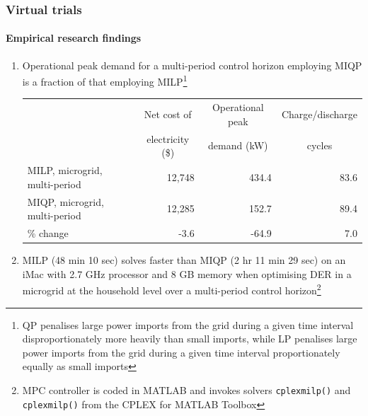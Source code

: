 \documentclass[handout, smaller, xcolor=table]{beamer}			%
\newcounter{enumcount}
\begin{document}
\begin{frame}
	\frametitle{Virtual trials}
	\framesubtitle{Empirical research findings}

	\begin{enumerate}
		\setcounter{enumi}{\value{enumcount}}
		\item  Operational peak demand for a multi-period control horizon employing MIQP is a fraction of that employing MILP\footnote{\scriptsize QP penalises large power imports from the grid during a given time interval disproportionately more heavily than small imports, while LP penalises large power imports from the grid during a given time interval proportionately equally as small imports
		}
			\begin{table}
			\centering
			{\scriptsize
			\begin{tabular}{l r r r}
				\toprule
				& \multicolumn{1}{c}{Net cost of}	& \multicolumn{1}{c}{Operational peak}	& \multicolumn{1}{c}{Charge/discharge}	\\
				& \multicolumn{1}{c}{	electricity (\$)} 	& \multicolumn{1}{c}{demand (kW)}		&\multicolumn{1}{c}{cycles}	\\
				\midrule
				MILP, microgrid, multi-period		& 12,748	& 434.4	& 83.6	\\
				MIQP, microgrid, multi-period		& 12,285	& 152.7	& 89.4	\\
				\midrule
				\% change	& -3.6		& -64.9		& 7.0		\\
				\bottomrule
			\end{tabular}
			}
			\end{table}
		
		\item  MILP (48 min 10 sec) solves faster than MIQP (2 hr 11 min 29 sec) on an iMac with 2.7 GHz processor and 8 GB memory when optimising DER in a microgrid at the household level over a multi-period control horizon\footnote{\scriptsize MPC controller is coded in \textsc{MATLAB} and invokes solvers \texttt{cplexmilp()} and \texttt{cplexmilp()} from the CPLEX for \textsc{MATLAB} Toolbox
		}
	
	\end{enumerate}

\end{frame}
\end{document}
